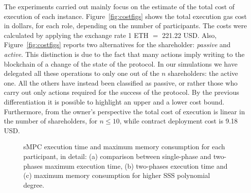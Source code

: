 The experiments carried out mainly focus on the estimate of the total cost of execution of each \shortname instance. 
Figure~\ref{fig:costfigs} shows the total execution gas cost in dollars, for each role, depending on the number of \shortname participants. 
The costs were calculated by applying the exchange rate {1 ETH $=$ 221.22 USD}.
Also, Figure~\ref{fig:costfigs} reports two alternatives for the shareholder: {\em passive} and {\em active}. 
This distinction is due to the fact that many \shortname actions imply writing to the blockchain of a change of the state of the protocol.
In our simulations we have delegated all these operations to only one out of the $n$ shareholders: the active one. 
All the others have instead been classified as passive, or rather those who carry out only actions required for the success of the protocol.
By the previous differentiation it is possible to highlight an upper and a lower cost bound.
Furthermore, from the owner's perspective the total cost of execution is linear in the number of shareholders, for $n \leq 10$, while contract deployment cost is 9.18 USD.

\begin{figure}[t]
	\centering
	\hfill
	\hfill
	\caption{sMPC execution time and maximum memory consumption for each participant, in detail: (a) comparison between single-phase and two-phases maximum execution time, (b) two-phases execution time and (c) maximum memory consumption for higher SSS polynomial degree.}
	\label{fig:timecomp}
\end{figure}

